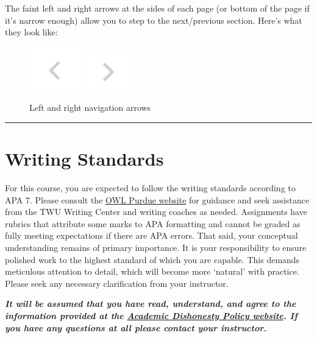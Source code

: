 \documentclass[
]{book}
\begin{document}
The faint left and right arrows at the sides of each page (or bottom of the page if it's narrow enough) allow you to step to the next/previous section. Here's what they look like:

\begin{figure}
 \includegraphics[width=0.93in]{assets/course-intro/left_arrow} \includegraphics[width=0.74in]{assets/course-intro/right_arrow} \caption{Left and right navigation arrows}\label{fig:unnamed-chunk-13}
 \end{figure}

\begin{center}\rule{0.5\linewidth}{0.5pt}\end{center}

\hypertarget{writing-standards}{%
\section*{Writing Standards}\label{writing-standards}}

For this course, you are expected to follow the writing standards according to APA 7. Please consult the \href{https://owl.purdue.edu/owl/research_and_citation/apa_style/apa_style_introduction.html}{OWL Purdue website} for guidance and seek assistance from the TWU Writing Center and writing coaches as needed. Assignments have rubrics that attribute some marks to APA formatting and cannot be graded as fully meeting expectations if there are APA errors. That said, your conceptual understanding remains of primary importance. It is your responsibility to ensure polished work to the highest standard of which you are capable. This demands meticulous attention to detail, which will become more `natural' with practice. Please seek any necessary clarification from your instructor.

\begin{caution}
\textbf{\emph{It will be assumed that you have read, understand, and
agree to the information provided at the
\href{https://www.twu.ca/student-policies/university-policies/academic-misconduct}{Academic
Dishonesty Policy website}. If you have any questions at all please
contact your instructor.}}
\end{caution}
\end{document}
